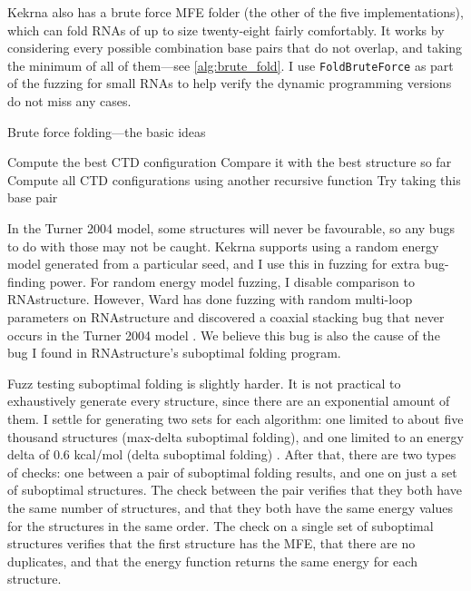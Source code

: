 \documentclass{cshonours}
\def\km{kcal/mol }
\begin{document}
Kekrna also has a brute force MFE folder (the other of the five implementations), which can fold RNAs of up to size twenty-eight fairly comfortably. It works by considering every possible combination base pairs that do not overlap, and taking the minimum of all of them---see \autoref{alg:brute_fold}. I use \texttt{FoldBruteForce} as part of the fuzzing for small RNAs to help verify the dynamic programming versions do not miss any cases.

\begin{algorithm}[H]
\caption{Brute force folding---the basic ideas}
\label{alg:brute_fold}
\begin{algorithmic}
 
\State Compute the best CTD configuration
\State Compare it with the best structure so far
\Else {}
\State Compute all CTD configurations using another recursive function
\State {}
\EndIf
\Else
\State {} 
\State Try taking this base pair
\State {}
\EndIf
\EndIf
\EndFunction
\end{algorithmic}
\end{algorithm}

In the Turner 2004 model, some structures will never be favourable, so any bugs to do with those may not be caught. Kekrna supports using a random energy model generated from a particular seed, and I use this in fuzzing for extra bug-finding power. For random energy model fuzzing, I disable comparison to RNAstructure. However, Ward has done fuzzing with random multi-loop parameters on RNAstructure and discovered a coaxial stacking bug that never occurs in the Turner 2004 model \cite{wardPersonal}. We believe this bug is also the cause of the bug I found in RNAstructure's suboptimal folding program.

Fuzz testing suboptimal folding is slightly harder. It is not practical to exhaustively generate every structure, since there are an exponential amount of them. I settle for generating two sets for each algorithm: one limited to about five thousand structures (max-delta suboptimal folding), and one limited to an energy delta of 0.6 \km (delta suboptimal folding) . After that, there are two types of checks: one between a pair of suboptimal folding results, and one on just a set of suboptimal structures. The check between the pair verifies that they both have the same number of structures, and that they both have the same energy values for the structures in the same order. The check on a single set of suboptimal structures verifies that the first structure has the MFE, that there are no duplicates, and that the energy function returns the same energy for each structure.
\end{document}
